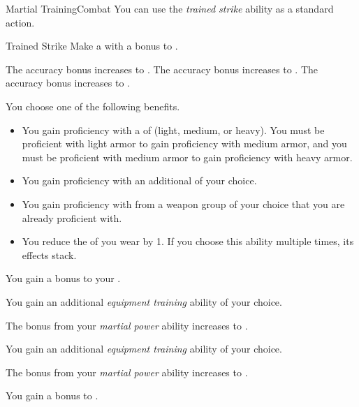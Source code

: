     \begin{feat}{Martial Training}{Combat}
         You can use the \textit{trained strike} ability as a standard action.
        \begin{freeability}{Trained Strike}
            Make a  with a  bonus to .

            \rankline
             The accuracy bonus increases to .
             The accuracy bonus increases to .
             The accuracy bonus increases to .
        \end{freeability}

         You choose one of the following benefits.
        \begin{itemize}
            \item You gain proficiency with a  of  (light, medium, or heavy).
                You must be proficient with light armor to gain proficiency with medium armor, and you must be proficient with medium armor to gain proficiency with heavy armor.
            \item You gain proficiency with an additional  of your choice.
            \item You gain proficiency with  from a weapon group of your choice that you are already proficient with.
            \item You reduce the  of  you wear by 1.
                If you choose this ability multiple times, its effects stack.
        \end{itemize}

         You gain a  bonus to your  .

         You gain an additional \textit{equipment training} ability of your choice.

         The bonus from your \textit{martial power} ability increases to .

         You gain an additional \textit{equipment training} ability of your choice.

         The bonus from your \textit{martial power} ability increases to .

         You gain a  bonus to .
    \end{feat}

